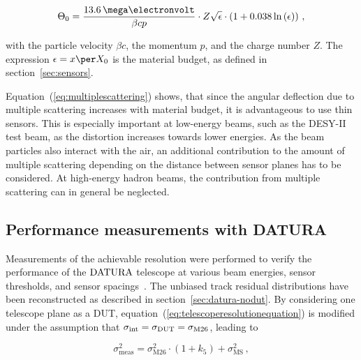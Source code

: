 \begin{equation}
\label{eq:multiplescattering}
\Theta_{0} = \frac{13.6\,\mega\electronvolt}{\beta c p} \cdot Z
\sqrt{\epsilon}
\cdot \left( 1 + 0.038 \ln{\left( \epsilon \right) } \right) \,,
\end{equation}

\noindent with the particle velocity $\beta c$, the momentum $p$, and the charge number $Z$. 
The expression $\epsilon = x \per X_0$ is the material budget, as defined in section~\ref{sec:sensors}.

Equation~(\ref{eq:multiplescattering}) shows, that since the angular deflection due to multiple scattering increases with material budget, it is advantageous to use thin sensors.
This is especially important at low-energy beams, such as the DESY-II test beam, as the distortion increases towards lower energies.
As the beam particles also interact with the air, an additional contribution to the amount of multiple scattering depending on the distance between sensor planes has to be considered. 
At high-energy hadron beams, the contribution from multiple scattering can in general be neglected.

\subsection{Performance measurements with DATURA}
\label{sec:measurements}

Measurements of the achievable resolution were performed to verify the performance of the $\textrm{DATURA}$ telescope at various beam energies, sensor thresholds, and sensor spacings~\cite{ref:thomas}.
The unbiased track residual distributions have been reconstructed as described in section~\ref{sec:datura-nodut}.
By considering one telescope plane as a DUT, equation~(\ref{eq:telescoperesolutionequation}) is modified under the assumption that $\sigma_{\textrm{int}} = \sigma_{\textrm{DUT}} = \sigma_{\textrm{M26}}$,
 leading to

\begin{equation}
\label{eq:telescoperesolutionequation_2}
\sigma_{\textrm{meas}}^2 = \sigma_{\textrm{M26}}^2 \cdot \left( 1 + k_5 \right) +
\sigma_{\textrm{MS}}^2\,,
\end{equation}

